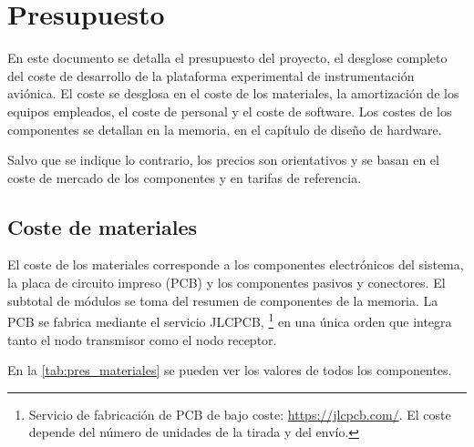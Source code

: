 
\chapter{Presupuesto}
\label{ch:presupuesto}

En este documento se detalla el presupuesto del proyecto, el desglose completo del coste
de desarrollo de la plataforma experimental de instrumentación aviónica. El coste
se desglosa en el coste de los materiales, la amortización de los equipos empleados, el coste de personal y el coste de software. Los costes de los componentes se detallan en la memoria, en el capítulo de diseño de hardware.

Salvo que se indique lo contrario, los precios son orientativos y se basan en el
coste de mercado de los componentes y en tarifas de referencia.

\section{Coste de materiales}
\label{sec:pres_materiales}

El coste de los materiales corresponde a los componentes electrónicos del sistema,
la placa de circuito impreso (PCB) y los componentes pasivos y conectores. El
subtotal de módulos se toma del resumen de componentes de la memoria. La PCB se
fabrica mediante el servicio JLCPCB, \footnote{Servicio de fabricación de PCB de bajo coste: \url{https://jlcpcb.com/}. El coste depende del número de unidades de la tirada y del envío.} en una única orden que integra tanto el nodo transmisor como el nodo receptor.

En la \cref{tab:pres_materiales} se pueden ver los valores de todos los componentes.

